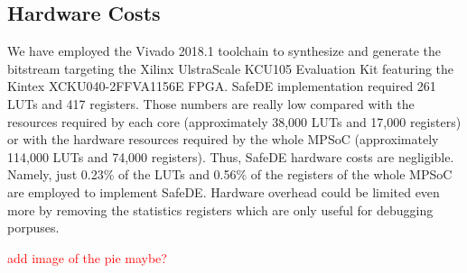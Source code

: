 \subsection{Hardware Costs}

We have employed the Vivado 2018.1 toolchain to synthesize and generate the bitstream targeting the Xilinx UlstraScale KCU105 Evaluation Kit featuring the Kintex XCKU040-2FFVA1156E FPGA. SafeDE implementation required 261 LUTs and 417 registers. Those numbers are really low compared with the resources required by each core (approximately 38,000 LUTs and 17,000 registers) or with the hardware resources required by the whole MPSoC (approximately 114,000 LUTs and 74,000 registers). Thus, SafeDE hardware costs are negligible. Namely, just 0.23\% of the LUTs and 0.56\% of the registers of the whole MPSoC are employed to implement SafeDE. Hardware overhead could be limited even more by removing the statistics registers which are only useful for debugging porpuses.

\textcolor{red}{add image of the pie maybe?}
\bigskip


